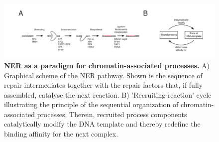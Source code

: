 \begin{figure}[htbp]
	\begin{center}
		\includegraphics[width=1\textwidth]{Abbildungen/figure1_1.pdf}
		\caption{\textbf{NER as a paradigm for chromatin-associated processes.} A) Graphical scheme of the NER pathway. Shown is the sequence of repair intermediates together with the repair factors that, if fully assembled, catalyse the next reaction. B) 'Recruiting-reaction' cycle illustrating the principle of the sequential organization of chromatin-associated processes. Therein, recruited process components catalytically modify the DNA template and thereby redefine the binding affinity for the next complex.}
		\label{fig:introScheme}
	\end{center}
\end{figure} 

